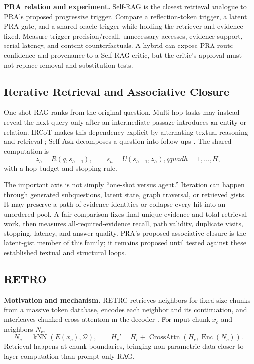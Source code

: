 \textbf{PRA relation and experiment.} Self-RAG is the closest retrieval analogue to PRA's
proposed progressive trigger. Compare a reflection-token trigger, a latent PRA gate, and a
shared oracle trigger while holding the retriever and evidence fixed. Measure trigger
precision/recall, unnecessary accesses, evidence support, serial latency, and content
counterfactuals. A hybrid can expose PRA route confidence and provenance to a Self-RAG
critic, but the critic's approval must not replace removal and substitution tests.

\subsection{Iterative Retrieval and Associative Closure}

One-shot RAG ranks from the original question. Multi-hop tasks may instead reveal the next
query only after an intermediate passage introduces an entity or relation. IRCoT makes this
dependency explicit by alternating textual reasoning and retrieval
\citep{trivedi2023ircot}; Self-Ask decomposes a question into follow-ups
\citep{press2022selfask}. The shared computation is
\begin{equation}
z_h=R(q,s_{h-1}),\qquad s_h=U(s_{h-1},z_h),qquad h=1,\ldots,H,
\end{equation}
with a hop budget and stopping rule.

The important axis is not simply ``one-shot versus agent.'' Iteration can happen through
generated subquestions, latent state, graph traversal, or retrieved gists. It may preserve a
path of evidence identities or collapse every hit into an unordered pool. A fair comparison
fixes final unique evidence and total retrieval work, then measures all-required-evidence
recall, path validity, duplicate visits, stopping, latency, and answer quality. PRA's proposed
associative closure is the latent-gist member of this family; it remains proposed until tested
against these established textual and structural loops.

\subsection{RETRO}

\textbf{Motivation and mechanism.} RETRO retrieves neighbors for fixed-size chunks from a
massive token database, encodes each neighbor and its continuation, and interleaves chunked
cross-attention in the decoder \citep{borgeaud2022retro}.  For input chunk $x_c$ and
neighbors $N_c$,
\begin{equation}
N_c=\operatorname{kNN}(E(x_c),\mathcal D),\qquad
H_c'=H_c+\operatorname{CrossAttn}(H_c,\operatorname{Enc}(N_c)).
\end{equation}
Retrieval happens at chunk boundaries, bringing non-parametric data closer to layer
computation than prompt-only RAG.

